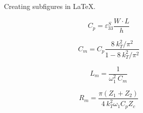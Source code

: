 \begin{figure}[!ht]
\begin{varwidth}{1.0\linewidth}
{      \label{fig:ch2_cillinder}
  }
\end{varwidth}
\begin{varwidth}{1.0\linewidth}
\end{varwidth}
  \caption{Creating subfigures in \LaTeX.}
  \label{fig:ch2_bvd_model_and_transducer_types}
\end{figure}

\begin{equation}
  C_p = \varepsilon ^S_{33} \frac{W \cdot L}{h}
  \label{eq:ch2_clamp_capacitance}
\end{equation}


\begin{equation}
  C_m = C_p \frac{8 \ k_T^2 / \pi^2 }{1 - 8 \ k_T^2 / \pi^2 }
  \label{eq:ch2_series_cap}
\end{equation}

\begin{equation}
  L_m = \frac{1} {\omega_1^2 \ C_m}
  \label{eq:ch2_series_inductor}
\end{equation}

\begin{equation}
  R_m = \frac{\pi \left(Z_1 + Z_2 \right)}{4 \ k_T ^2 \omega_1 C_p Z_c}
  \label{eq:ch2_series_resistor}
\end{equation}

